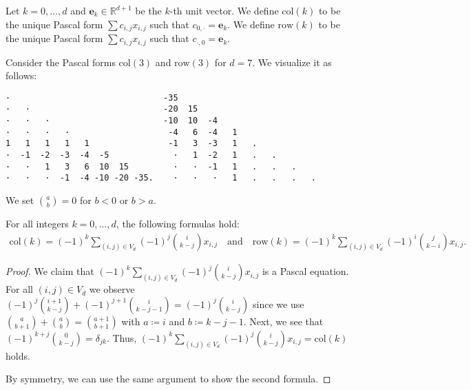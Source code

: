 \begin{definition}\label{def:row-col}
    Let \( k = 0, \dots, d \) and \( \mathbf e_k \in \mathbb{R}^{d+1} \) be the \( k \)-th unit vector. We define \( \mathrm{col}(k) \) to be the unique Pascal form \( \sum c_{i,j}x_{i,j} \) such that \( c_{0,\cdot} = \mathbf e_k \). We define \( \mathrm{row}(k) \) to be the unique Pascal form \( \sum c_{i,j}x_{i,j} \) such that \( c_{\cdot,0} = \mathbf e_k \).
\end{definition}

\begin{example}
    Consider the Pascal forms \( \mathrm{col}(3) \) and \( \mathrm{row}(3) \) for \( d = 7 \). We visualize it as follows: 
    \begin{verbatim}
·                               -35
·   ·                           -20  15
·   ·   ·                       -10  10  -4
·   ·   ·   ·                    -4   6  -4   1 
1   1   1   1   1                -1   3  -3   1   . 
·  -1  -2  -3  -4  -5             ·   1  -2   1   .   . 
·   ·   1   3   6  10  15         ·   ·  -1   1   .   .   . 
·   ·   ·  -1  -4 -10 -20 -35.    ·   ·   ·   1   .   .   .   .
    \end{verbatim}
\end{example}

We set \( \binom{a}{b} = 0 \) for \( b < 0 \) or \( b > a \).

\begin{proposition}\label{prop:pascal-formulas}
    For all integers \( k = 0, \dots, d \), the following formulas hold:
    \begin{gather*}
        \mathrm{col}(k)  = (-1)^k \sum_{(i,j) \in V_d} (-1)^j \binom{i}{k-j} x_{i,j} \quad \text{and} \quad
        \mathrm{row}(k) = (-1)^k \sum_{(i,j) \in V_d} (-1)^i \binom{j}{k-i} x_{i,j}.
    \end{gather*} 
\end{proposition}

\begin{proof}
    We claim that \( (-1)^k \sum_{(i,j) \in V_d} (-1)^j \binom{i}{k-j} x_{i,j} \) is a Pascal equation. For all \( (i,j) \in V_{d} \) we observe \( (-1)^j \binom{i+1}{k-j} + (-1)^{j+1} \binom{i}{k-j-1} = (-1)^j \binom{i}{k-j} \)
     since we use \(  \binom{a}{b+1} + \binom{a}{b} = \binom{a+1}{b+1} \) with \( a \coloneqq i \) and \( b \coloneqq k-j-1 \). Next, we see that \( (-1)^{k+j} \binom{0}{k-j} = \delta_{jk} \). Thus, \( (-1)^k \sum_{(i,j) \in V_d} (-1)^j \binom{i}{k-j} x_{i,j} = \mathrm{col}(k) \) holds.

     By symmetry, we can use the same argument to show the second formula.
\end{proof}

